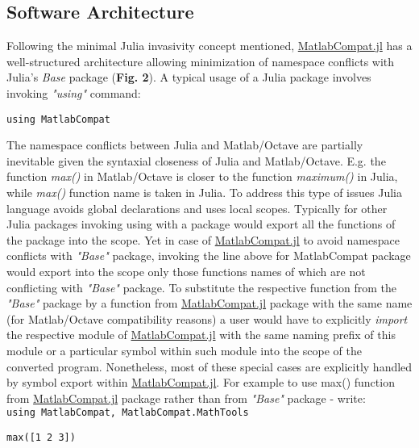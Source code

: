 \subsection{Software Architecture}
\label{Architecture} 

Following the minimal Julia invasivity concept mentioned, \href{https://github.com/MatlabCompat/MatlabCompat.jl}{MatlabCompat.jl} has a well-structured architecture allowing minimization of namespace conflicts with Julia's \textit{Base} package (\textbf{Fig. 2}). A typical usage of a Julia package involves invoking \textit{"using"} command:

\verb|using MatlabCompat|

The namespace conflicts between Julia and Matlab/Octave are partially inevitable given the syntaxial closeness of Julia and Matlab/Octave. E.g. the function \textit{max()} in Matlab/Octave is closer to the function \textit{maximum()} in Julia, while \textit{max()} function name is taken in Julia. To address this type of issues Julia language avoids global declarations and uses local scopes. Typically for other Julia packages invoking using with a package would export all the functions of the package into the scope. Yet in case of \href{https://github.com/MatlabCompat/MatlabCompat.jl}{MatlabCompat.jl} to avoid namespace conflicts with \textit{"Base"} package, invoking the line above for MatlabCompat package would export into the scope only those functions names of which are not conflicting with \textit{"Base"} package. To substitute the respective function from the \textit{"Base"} package by a function from \href{https://github.com/MatlabCompat/MatlabCompat.jl}{MatlabCompat.jl} package with the same name (for Matlab/Octave compatibility reasons) a user would have to explicitly \textit{import} the respective module of \href{https://github.com/MatlabCompat/MatlabCompat.jl}{MatlabCompat.jl} with the same naming prefix of this module or a particular symbol within such module into the scope of the converted program. Nonetheless, most of these special cases are explicitly handled by symbol export within \href{https://github.com/MatlabCompat/MatlabCompat.jl}{MatlabCompat.jl}. For example to use max() function from \href{https://github.com/MatlabCompat/MatlabCompat.jl}{MatlabCompat.jl} package rather than from \textit{"Base"} package - write:\\

\verb|using MatlabCompat, MatlabCompat.MathTools|

\verb|max([1 2 3])|

